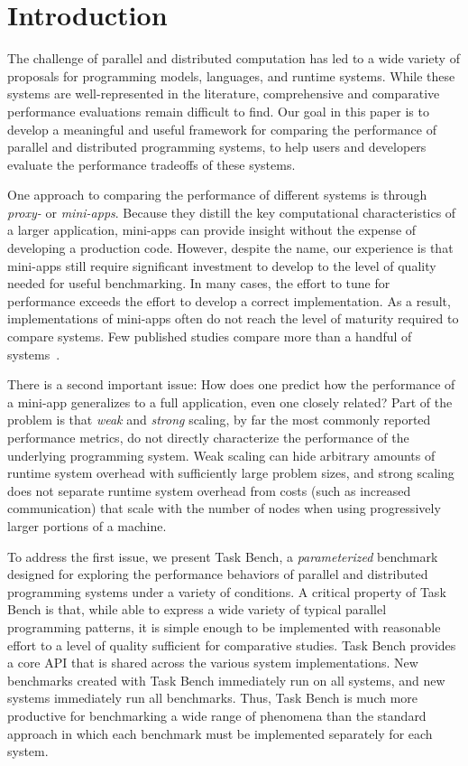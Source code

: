 \section{Introduction}
\label{sec:introduction}

The challenge of parallel and distributed computation has led to a
wide variety of proposals for programming models, languages, and
runtime systems. While these systems are well-represented in the literature, comprehensive and comparative performance evaluations
remain difficult to find. Our
goal in this paper is to develop a meaningful and useful framework for
comparing the performance of parallel and distributed programming
systems, to help users and developers evaluate the performance tradeoffs of these systems.

One approach to comparing the performance of different systems is through \emph{proxy-} or
\emph{mini-apps}. Because they distill the key computational characteristics of a larger
application, mini-apps can provide insight
without the expense of developing a production code. However, despite the name, our experience is that
mini-apps still require significant investment to develop
to the level of quality needed for useful benchmarking. In many cases,
the effort to tune for performance exceeds the effort to develop a correct implementation. As a result, implementations of mini-apps
often do not reach the level of maturity required to compare
systems. Few published studies compare more than a handful of systems~\cite{LULESH13}.

There is a second important issue: How does one predict how
the performance of a mini-app generalizes to a full
application, even one closely related? Part of the problem is
that \emph{weak} and \emph{strong} scaling, by far the most commonly
reported performance metrics,
do not directly characterize the performance of the underlying
programming system. Weak scaling can hide arbitrary amounts of runtime
system overhead with sufficiently large problem sizes, and strong
scaling does not separate runtime system overhead from costs
(such as increased communication) that scale with the number of nodes when
using progressively larger portions of a machine.

To address the first issue, we present Task Bench, a
\emph{parameterized} benchmark designed for exploring the performance
behaviors of parallel and distributed programming systems under a
variety of conditions. A critical property of Task Bench is that,
while able to express a wide variety of typical parallel programming
patterns, it is simple enough to be implemented with reasonable effort
to a level of quality sufficient for comparative
studies. Task Bench provides a core API that is shared across the
various system implementations. New benchmarks created with Task Bench
immediately run on all systems, and new systems immediately run all
benchmarks. Thus, Task Bench is much more productive for benchmarking
a wide range of phenomena than the standard approach in which each
benchmark must be implemented separately for each system.

